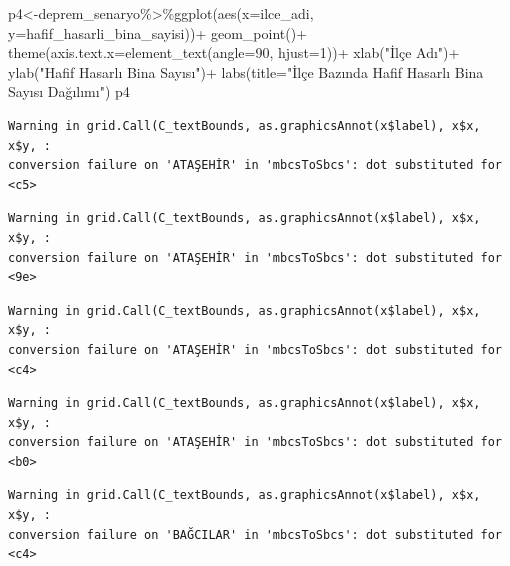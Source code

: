 \documentclass[
  11pt,
  a4paper,
  DIV=11,
  numbers=noendperiod]{scrartcl}
\newenvironment{Shaded}{\begin{snugshade}}{\end{snugshade}}
\newcommand{\AttributeTok}[1]{\textcolor[rgb]{0.40,0.45,0.13}{#1}}
\newcommand{\DecValTok}[1]{\textcolor[rgb]{0.68,0.00,0.00}{#1}}
\newcommand{\FunctionTok}[1]{\textcolor[rgb]{0.28,0.35,0.67}{#1}}
\newcommand{\NormalTok}[1]{\textcolor[rgb]{0.00,0.23,0.31}{#1}}
\newcommand{\OtherTok}[1]{\textcolor[rgb]{0.00,0.23,0.31}{#1}}
\newcommand{\SpecialCharTok}[1]{\textcolor[rgb]{0.37,0.37,0.37}{#1}}
\newcommand{\StringTok}[1]{\textcolor[rgb]{0.13,0.47,0.30}{#1}}
\begin{document}
\begin{Shaded}
\begin{Highlighting}[]
\NormalTok{p4}\OtherTok{\textless{}{-}}\NormalTok{deprem\_senaryo}\SpecialCharTok{\%\textgreater{}\%}\FunctionTok{ggplot}\NormalTok{(}\FunctionTok{aes}\NormalTok{(}\AttributeTok{x=}\NormalTok{ilce\_adi, }\AttributeTok{y=}\NormalTok{hafif\_hasarli\_bina\_sayisi))}\SpecialCharTok{+}
  \FunctionTok{geom\_point}\NormalTok{()}\SpecialCharTok{+}
  \FunctionTok{theme}\NormalTok{(}\AttributeTok{axis.text.x=}\FunctionTok{element\_text}\NormalTok{(}\AttributeTok{angle=}\DecValTok{90}\NormalTok{, }\AttributeTok{hjust=}\DecValTok{1}\NormalTok{))}\SpecialCharTok{+}
  \FunctionTok{xlab}\NormalTok{(}\StringTok{"İlçe Adı"}\NormalTok{)}\SpecialCharTok{+}
  \FunctionTok{ylab}\NormalTok{(}\StringTok{"Hafif Hasarlı Bina Sayısı"}\NormalTok{)}\SpecialCharTok{+}
  \FunctionTok{labs}\NormalTok{(}\AttributeTok{title=}\StringTok{"İlçe Bazında Hafif Hasarlı Bina Sayısı Dağılımı"}\NormalTok{)}
\NormalTok{p4}
\end{Highlighting}
\end{Shaded}

\begin{verbatim}
Warning in grid.Call(C_textBounds, as.graphicsAnnot(x$label), x$x, x$y, :
conversion failure on 'ATAŞEHİR' in 'mbcsToSbcs': dot substituted for <c5>
\end{verbatim}

\begin{verbatim}
Warning in grid.Call(C_textBounds, as.graphicsAnnot(x$label), x$x, x$y, :
conversion failure on 'ATAŞEHİR' in 'mbcsToSbcs': dot substituted for <9e>
\end{verbatim}

\begin{verbatim}
Warning in grid.Call(C_textBounds, as.graphicsAnnot(x$label), x$x, x$y, :
conversion failure on 'ATAŞEHİR' in 'mbcsToSbcs': dot substituted for <c4>
\end{verbatim}

\begin{verbatim}
Warning in grid.Call(C_textBounds, as.graphicsAnnot(x$label), x$x, x$y, :
conversion failure on 'ATAŞEHİR' in 'mbcsToSbcs': dot substituted for <b0>
\end{verbatim}

\begin{verbatim}
Warning in grid.Call(C_textBounds, as.graphicsAnnot(x$label), x$x, x$y, :
conversion failure on 'BAĞCILAR' in 'mbcsToSbcs': dot substituted for <c4>
\end{verbatim}
\end{document}
